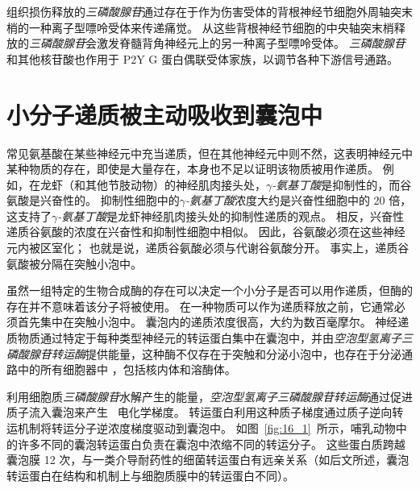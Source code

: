 组织损伤释放的\textit{三磷酸腺苷}通过存在于作为伤害受体的背根神经节细胞外周轴突末梢的一种离子型嘌呤受体来传递痛觉。
从这些背根神经节细胞的中央轴突末梢释放的\textit{三磷酸腺苷}会激发脊髓背角神经元上的另一种离子型嘌呤受体。
\textit{三磷酸腺苷}和其他核苷酸也作用于 P2Y G 蛋白偶联受体家族，以调节各种下游信号通路。



\section{小分子递质被主动吸收到囊泡中}

常见氨基酸在某些神经元中充当递质，但在其他神经元中则不然，这表明神经元中某种物质的存在，即使是大量存在，本身也不足以证明该物质被用作递质。
例如，在龙虾（和其他节肢动物）的神经肌肉接头处，\textit{$\gamma$-氨基丁酸}是抑制性的，而谷氨酸是兴奋性的。
抑制性细胞中的\textit{$\gamma$-氨基丁酸}浓度大约是兴奋性细胞中的 20 倍，这支持了\textit{$\gamma$-氨基丁酸}是龙虾神经肌肉接头处的抑制性递质的观点。
相反，兴奋性递质谷氨酸的浓度在兴奋性和抑制性细胞中相似。
因此，谷氨酸必须在这些神经元内被区室化；
也就是说，递质谷氨酸必须与代谢谷氨酸分开。
事实上，递质谷氨酸被分隔在突触小泡中。


虽然一组特定的生物合成酶的存在可以决定一个小分子是否可以用作递质，但酶的存在并不意味着该分子将被使用。
在一种物质可以作为递质释放之前，它通常必须首先集中在突触小泡中。
囊泡内的递质浓度很高，大约为数百毫摩尔。
神经递质物质通过特定于每种类型神经元的转运蛋白集中在囊泡中，并由\textit{空泡型氢离子三磷酸腺苷转运酶}提供能量，这种酶不仅存在于突触和分泌小泡中，也存在于分泌通路中的所有细胞器中 ，包括核内体和溶酶体。


利用细胞质\textit{三磷酸腺苷}水解产生的能量，\textit{空泡型氢离子三磷酸腺苷转运酶}通过促进质子流入囊泡来产生~ 电化学梯度。
转运蛋白利用这种质子梯度通过质子逆向转运机制将转运分子逆浓度梯度驱动到囊泡中。
如图~\ref{fig:16_1}~所示，哺乳动物中的许多不同的囊泡转运蛋白负责在囊泡中浓缩不同的转运分子。
这些蛋白质跨越囊泡膜 12 次，与一类介导耐药性的细菌转运蛋白有远亲关系（如后文所述，囊泡转运蛋白在结构和机制上与细胞质膜中的转运蛋白不同）。



